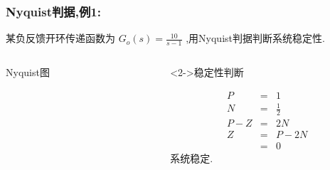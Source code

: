 \documentclass[table]{beamer}
\begin{document}
\begin{frame}
\frametitle{Nyquist判据,例1:}
\label{sec-1-5}

某负反馈开环传递函数为 $G_o(s)=\frac{10}{s-1}$ ,用Nyquist判据判断系统稳定性.
\begin{columns}
\begin{column}{0.5\textwidth}
\begin{block}{Nyquist图}
\label{sec-1-5-1}

\end{block}
\end{column}
\begin{column}{0.5\textwidth}
\begin{block}<2->{稳定性判断}
\label{sec-1-5-2}

\begin{eqnarray*}
P & = & 1\\
N &=& \frac{1}{2} \\
P-Z &=& 2N \\
Z &=& P-2N \\
  &=&0 
\end{eqnarray*}
系统稳定.
\end{block}
\end{column}
\end{columns}
\end{frame}
\end{document}
